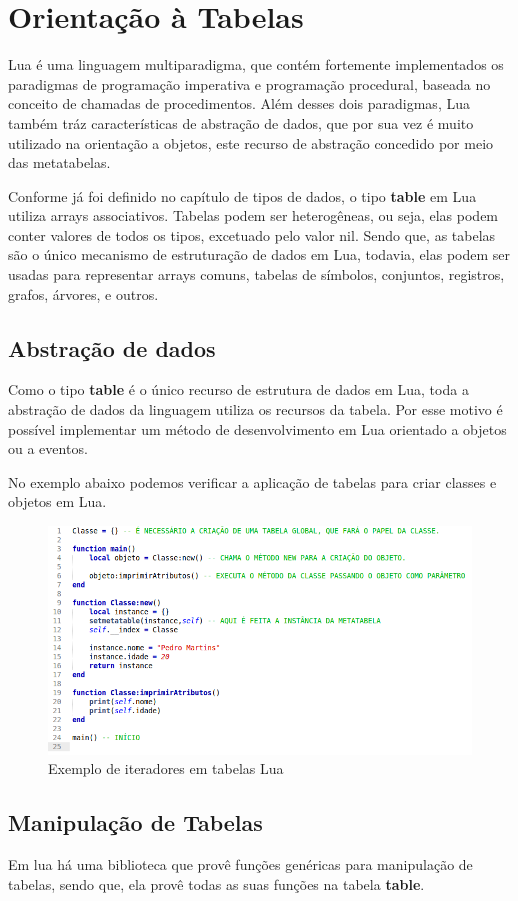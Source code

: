 \documentclass[
12pt, %
openright, %
oneside, %
a4paper, %
english, %
brazil, %
]{abntex2}
\begin{document}
\chapter{Orientação à Tabelas}
Lua é uma linguagem multiparadigma, que contém fortemente implementados os paradigmas de programação imperativa e programação procedural, baseada no conceito de chamadas de procedimentos. Além desses dois paradigmas, Lua também tráz características de abstração de dados, que por sua vez é muito utilizado na orientação a objetos, este recurso de abstração concedido por meio das metatabelas. 

Conforme já foi definido no capítulo de tipos de dados, o tipo \textbf{table} em Lua utiliza arrays associativos. Tabelas podem ser heterogêneas, ou seja, elas podem conter valores de todos os tipos, excetuado pelo valor nil. Sendo que, as tabelas são o único mecanismo de estruturação de dados em Lua, todavia, elas podem ser usadas para representar arrays comuns, tabelas de símbolos, conjuntos, registros, grafos, árvores, e outros.

\section{Abstração de dados}
Como o tipo \textbf{table} é o único recurso de estrutura de dados em Lua, toda a abstração de dados da linguagem utiliza os recursos da tabela. Por esse motivo é possível implementar um método de desenvolvimento em Lua orientado a objetos ou a eventos.

No exemplo abaixo podemos verificar a aplicação de tabelas para criar classes e objetos em Lua.

\begin{figure}[H]
\centering
\includegraphics[width=0.8\linewidth]{imagens/OO.png}
\caption{Exemplo de iteradores em tabelas Lua}
\end{figure}

\section{Manipulação de Tabelas}
Em lua há uma biblioteca que provê funções genéricas para manipulação de tabelas, sendo que, ela provê todas as suas funções na tabela \textbf{table}.
\end{document}
